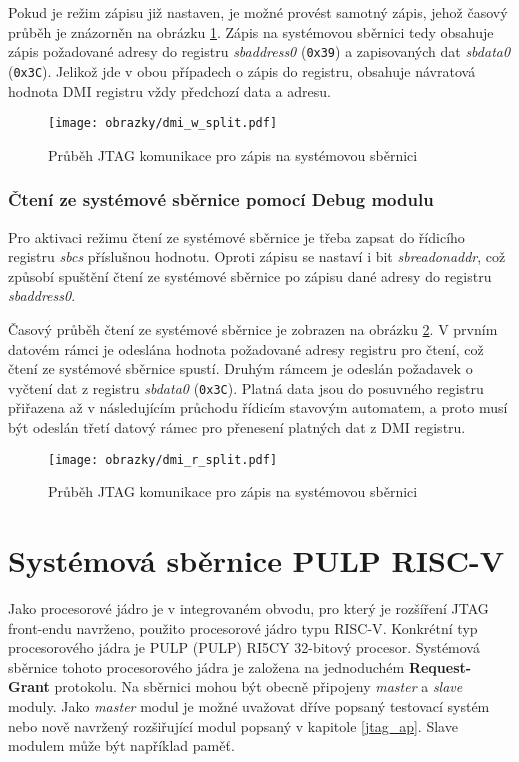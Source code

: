 Pokud je režim zápisu již nastaven, je možné provést samotný zápis, jehož časový průběh je znázorněn na obrázku \ref{fig:dmi_w}. Zápis na systémovou sběrnici tedy obsahuje zápis požadované adresy do registru \textit{sbaddress0} (\texttt{0x39}) a zapisovaných dat \textit{sbdata0} (\texttt{0x3C}). Jelikož jde v obou případech o zápis do registru, obsahuje návratová hodnota \acs{DMI} registru vždy předchozí data a adresu.
 
\begin{figure}[!h]
  \begin{center}
    \texttt{[image: obrazky/dmi\_w\_split.pdf]}
  \end{center}
  \caption{Průběh \acs{JTAG} komunikace pro zápis na systémovou sběrnici}
	\label{fig:dmi_w}
\end{figure}

\subsubsection{Čtení ze systémové sběrnice pomocí Debug modulu}
Pro aktivaci režimu čtení ze systémové sběrnice je třeba zapsat do řídicího registru \textit{sbcs} příslušnou hodnotu. Oproti zápisu se nastaví i bit \textit{sbreadonaddr}, což způsobí spuštění čtení ze systémové sběrnice po zápisu dané adresy do registru \textit{sbaddress0}.

Časový průběh čtení ze systémové sběrnice je zobrazen na obrázku \ref{fig:dmi_r}. V prvním datovém rámci je odeslána hodnota požadované adresy registru pro čtení, což čtení ze systémové sběrnice spustí. Druhým rámcem je odeslán požadavek o vyčtení dat z registru \textit{sbdata0} (\texttt{0x3C}). Platná data jsou do posuvného registru přiřazena až v následujícím průchodu řídicím stavovým automatem, a proto musí být odeslán třetí datový rámec pro přenesení platných dat z \acs{DMI} registru.

\begin{figure}[!h]
  \begin{center}
    \texttt{[image: obrazky/dmi\_r\_split.pdf]}
  \end{center}
  \caption{Průběh \acs{JTAG} komunikace pro zápis na systémovou sběrnici}
	\label{fig:dmi_r}
\end{figure}

\section{Systémová sběrnice PULP RISC-V}	\label{sec:sys_bus}
Jako procesorové jádro je v integrovaném obvodu, pro který je rozšíření JTAG front-endu navrženo, použito procesorové jádro typu \acs{RISC-V}. Konkrétní typ procesorového jádra je \acs{PULP} (\acl{PULP}) RI5CY 32-bitový procesor. Systémová sběrnice tohoto procesorového jádra je založena na jednoduchém \textbf{Request-Grant} protokolu. Na sběrnici mohou být obecně připojeny \textit{master} a \textit{slave} moduly. Jako \textit{master} modul je možné uvažovat dříve popsaný testovací systém nebo nově navržený rozšiřující modul popsaný v kapitole \ref{jtag_ap}. Slave modulem může být například paměť.

